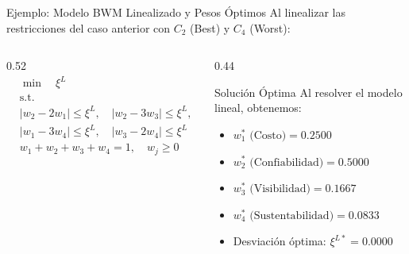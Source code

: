 \documentclass[aspectratio=169, 10pt]{beamer}
\begin{document}
\begin{frame}{Ejemplo: Modelo BWM Linealizado y Pesos Óptimos}
    Al linealizar las restricciones del caso anterior con $C_2$ (Best) y $C_4$ (Worst):
    \begin{columns}[T]
        \begin{column}{0.52\textwidth}
            \scriptsize
            \[
            \begin{aligned}
                & \min \quad \xi^L \\
                & \text{s.t.} \\
                & |w_2 - 2w_1| \le \xi^L, \quad |w_2 - 3w_3| \le \xi^L, \quad |w_2 - 6w_4| \le \xi^L \\
                & |w_1 - 3w_4| \le \xi^L, \quad |w_3 - 2w_4| \le \xi^L \\
                & w_1 + w_2 + w_3 + w_4 = 1, \quad w_j \ge 0
            \end{aligned}
            \]
        \end{column}
        \begin{column}{0.44\textwidth}
            \begin{block}{Solución Óptima}
                \scriptsize
                Al resolver el modelo lineal, obtenemos:
                \begin{itemize}
                    \item $w_1^* \text{ (Costo)} = \mathbf{0.2500}$
                    \item $w_2^* \text{ (Confiabilidad)} = \mathbf{0.5000}$
                    \item $w_3^* \text{ (Visibilidad)} = \mathbf{0.1667}$
                    \item $w_4^* \text{ (Sustentabilidad)} = \mathbf{0.0833}$
                    \item Desviación óptima: $\xi^{L*} = \mathbf{0.0000}$
                \end{itemize}
            \end{block}
        \end{column}
    \end{columns}
\end{frame}
\end{document}
